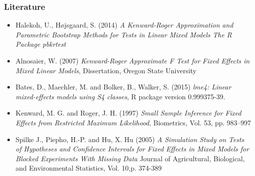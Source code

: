 \documentclass[compress]{beamer}\usepackage[]{graphicx}\usepackage[]{color}
\newenvironment{sframe}
{\begin{frame} [containsverbatim] }
  {\end{frame}}
\begin{document}
\begin{sframe}
  \frametitle{Literature}

\begin{itemize}
\item Halekoh, U., H{\o}jsgaard, S. (2014)
\textit{ 	A Kenward-Roger Approximation and Parametric Bootstrap Methods for Tests in Linear Mixed Models The R Package pbkrtest}
\item
Alnosaier, W. (2007) 
\textit{Kenward-Roger Approximate F Test for Fixed Effects in Mixed Linear Models}, Dissertation, Oregon State University  
\item
Bates, D., Maechler, M.  and Bolker, B., Walker, S. (2015)
\textit{lme4: Linear mixed-effects models using S4 classes},
R package version 0.999375-39.
\item
Kenward,  M. G. and Roger, J. H. (1997)
\textit{Small Sample Inference for Fixed Effects from Restricted Maximum Likelihood},
Biometrics, Vol. 53, pp. 983--997                    
\item
Spilke J., Piepho, H.-P. and Hu, X. Hu (2005)
\textit{A Simulation Study on Tests of Hypotheses
and Confidence Intervals for Fixed Effects in
Mixed Models for Blocked Experiments With
Missing Data}
Journal of Agricultural, Biological, and Environmental Statistics,
Vol. 10,p. 374-389
\end{itemize}
\end{sframe}
\end{document}
